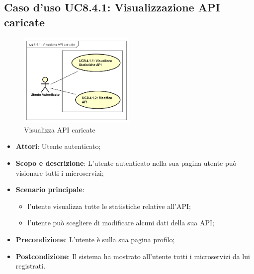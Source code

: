 \documentclass[12pt,a4paper,titlepage]{article}
\begin{document}
	\subsection{Caso d'uso UC8.4.1: Visualizzazione API caricate}
	\label{UC8.4.1}
	\begin{figure}[H]
		\centering
		\includegraphics[width=0.5\textwidth]{UseCase/APICaricate}
		\caption{Visualizza API caricate}
	\end{figure}
	\begin{itemize}
		\item \textbf{Attori}: Utente autenticato;
		\item \textbf{Scopo e descrizione}: L'utente autenticato nella sua pagina utente può visionare tutti i microservizi;
		\item \textbf{Scenario principale}:
			\begin{itemize}
				\item l'utente visualizza tutte le statistiche relative all'API;
				\item l'utente può scegliere di modificare alcuni dati della sua API;
			\end{itemize}
		\item \textbf{Precondizione}: L'utente è sulla sua pagina profilo;
		\item \textbf{Postcondizione}: Il sistema ha mostrato all'utente tutti i microservizi da lui registrati.
	\end{itemize}
\end{document}
